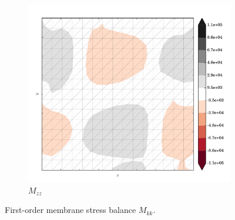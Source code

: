 \begin{figure}
  \begin{subfigure}[b]{0.3\linewidth}
    \includegraphics[width=\linewidth]{images/stress_balance/BP/M_zz.pdf}
  \caption{$M_{zz}$}
  \label{bp_M_zz}
  \end{subfigure}
 
  \caption[ISMIP-HOM first-order membrane stress balance]{First-order membrane stress balance $M_{kk}$.}

  \label{bp_membrane_stress_balance}

\end{figure}
